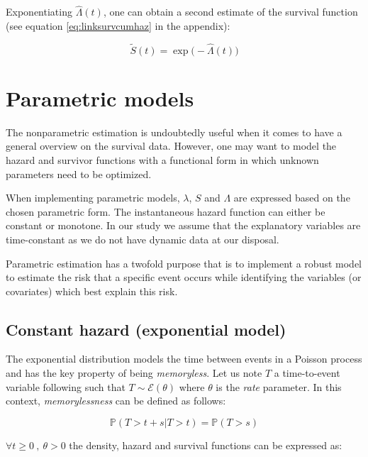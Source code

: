 \documentclass[
]{book}
\begin{document}
Exponentiating \(\hat{\Lambda}(t)\), one can obtain a second estimate of the survival function (see equation \eqref{eq:linksurvcumhaz} in the appendix):

\begin{equation}
    \tilde{S}(t) = \exp \big( -\hat{\Lambda}(t) \big)
    \label{eq:survest}
\end{equation}

\hypertarget{parametric-models}{%
\section{Parametric models}\label{parametric-models}}

The nonparametric estimation is undoubtedly useful when it comes to have a general overview on the survival data. However, one may want to model the hazard and survivor functions with a functional form in which unknown parameters need to be optimized.

When implementing parametric models, \(\lambda\), \(S\) and \(\Lambda\) are expressed based on the chosen parametric form. The instantaneous hazard function can either be constant or monotone. In our study we assume that the explanatory variables are time-constant as we do not have dynamic data at our disposal.

Parametric estimation has a twofold purpose that is to implement a robust model to estimate the risk that a specific event occurs while identifying the variables (or covariates) which best explain this risk.

\hypertarget{constant-hazard-exponential-model}{%
\subsection{Constant hazard (exponential model)}\label{constant-hazard-exponential-model}}

The exponential distribution models the time between events in a Poisson process and has the key property of being \emph{memoryless}. Let us note \(T\) a time-to-event variable following such that \(T \sim \mathcal{E}(\theta)\) where \(\theta\) is the \emph{rate} parameter. In this context, \emph{memorylessness} can be defined as follows:

\begin{equation}
  \mathbb{P}(T>t+s | T > t) = \mathbb{P}(T>s)
  \label{eq:memorylessness}
\end{equation}

\(\forall t \geq 0\ ,\ \theta > 0\) the density, hazard and survival functions can be expressed as:
\end{document}
